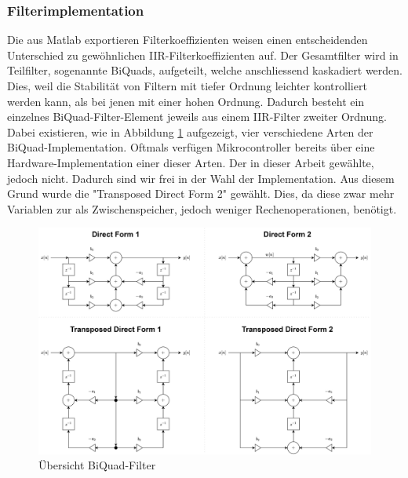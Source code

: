 \documentclass[12pt]{article}
\begin{document}
	\subsubsection*{Filterimplementation}
	Die aus Matlab exportieren Filterkoeffizienten weisen einen entscheidenden Unterschied zu gewöhnlichen IIR-Filterkoeffizienten auf. Der Gesamtfilter wird in Teilfilter, sogenannte BiQuads, aufgeteilt, welche anschliessend kaskadiert werden. Dies, weil die Stabilität von Filtern mit tiefer Ordnung leichter kontrolliert werden kann, als bei jenen mit einer hohen Ordnung. Dadurch besteht ein einzelnes BiQuad-Filter-Element jeweils aus einem IIR-Filter zweiter Ordnung. Dabei existieren, wie in Abbildung \ref{fig:batbiquad-uebersicht} aufgezeigt, vier verschiedene Arten der BiQuad-Implementation. Oftmals verfügen Mikrocontroller bereits über eine Hardware-Implementation einer dieser Arten. Der in dieser Arbeit gewählte, jedoch nicht. Dadurch sind wir frei in der Wahl der Implementation. Aus diesem Grund wurde die "Transposed Direct Form 2" gewählt. Dies, da diese zwar mehr Variablen zur als Zwischenspeicher, jedoch weniger Rechenoperationen, benötigt.
	\begin{figure}[H]
		\centering
		\includegraphics[width=1\linewidth]{images/BAT_BiQuad-Uebersicht}
		\caption{Übersicht BiQuad-Filter}
		\label{fig:batbiquad-uebersicht}
	\end{figure}
\end{document}
